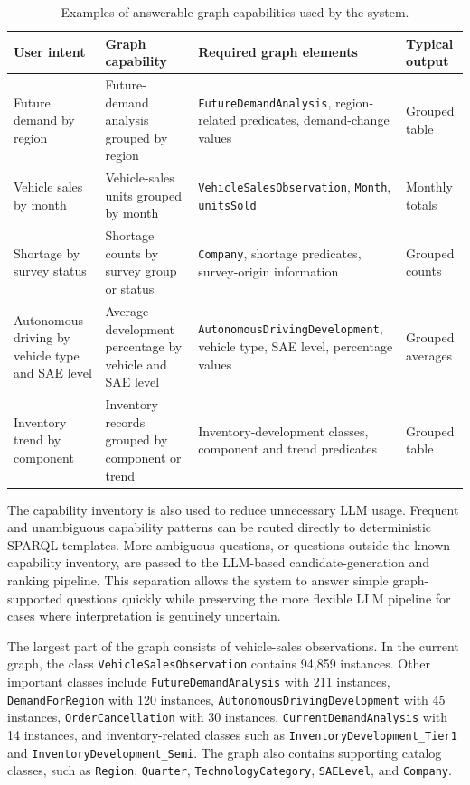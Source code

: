 \begin{table}[ht]
\centering
\caption{Examples of answerable graph capabilities used by the system.}
\label{tab:capability-examples}
\begin{tabular}{p{3.6cm}p{4.1cm}p{4.0cm}p{2.6cm}}
\hline
\textbf{User intent} & \textbf{Graph capability} & \textbf{Required graph elements} & \textbf{Typical output} \\
\hline
Future demand by region & Future-demand analysis grouped by region & \texttt{FutureDemandAnalysis}, region-related predicates, demand-change values & Grouped table \\
Vehicle sales by month & Vehicle-sales units grouped by month & \texttt{VehicleSalesObservation}, \texttt{Month}, \texttt{unitsSold} & Monthly totals \\
Shortage by survey status & Shortage counts by survey group or status & \texttt{Company}, shortage predicates, survey-origin information & Grouped counts \\
Autonomous driving by vehicle type and SAE level & Average development percentage by vehicle and SAE level & \texttt{AutonomousDrivingDevelopment}, vehicle type, SAE level, percentage values & Grouped averages \\
Inventory trend by component & Inventory records grouped by component or trend & Inventory-development classes, component and trend predicates & Grouped table \\
\hline
\end{tabular}
\end{table}

The capability inventory is also used to reduce unnecessary LLM usage. Frequent and unambiguous capability patterns can be routed directly to deterministic SPARQL templates. More ambiguous questions, or questions outside the known capability inventory, are passed to the LLM-based candidate-generation and ranking pipeline. This separation allows the system to answer simple graph-supported questions quickly while preserving the more flexible LLM pipeline for cases where interpretation is genuinely uncertain.

The largest part of the graph consists of vehicle-sales observations. In the current graph, the class \texttt{VehicleSalesObservation} contains 94,859 instances. Other important classes include \texttt{FutureDemandAnalysis} with 211 instances, \texttt{DemandForRegion} with 120 instances, \texttt{AutonomousDrivingDevelopment} with 45 instances, \texttt{OrderCancellation} with 30 instances, \texttt{CurrentDemandAnalysis} with 14 instances, and inventory-related classes such as \texttt{InventoryDevelopment\_Tier1} and \texttt{InventoryDevelopment\_Semi}. The graph also contains supporting catalog classes, such as \texttt{Region}, \texttt{Quarter}, \texttt{TechnologyCategory}, \texttt{SAELevel}, and \texttt{Company}.

